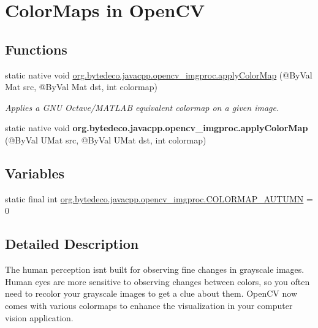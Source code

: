 \hypertarget{group__imgproc__colormap}{}\section{Color\+Maps in Open\+CV}
\label{group__imgproc__colormap}
\subsection*{Functions}
\begin{DoxyCompactItemize}
\item 
static native void \hyperlink{group__imgproc__colormap_ga06d689b1055417421851333387c2b607}{org.\+bytedeco.\+javacpp.\+opencv\+\_\+imgproc.\+apply\+Color\+Map} (@By\+Val Mat src, @By\+Val Mat dst, int colormap)
\begin{DoxyCompactList}\small\item\em Applies a G\+NU Octave/\+M\+A\+T\+L\+AB equivalent colormap on a given image. \end{DoxyCompactList}\item 
\mbox{\label{group__imgproc__colormap_gae1ccc84ecf15399edb67f8a9bdd23c24}} 
static native void {\bfseries org.\+bytedeco.\+javacpp.\+opencv\+\_\+imgproc.\+apply\+Color\+Map} (@By\+Val U\+Mat src, @By\+Val U\+Mat dst, int colormap)
\end{DoxyCompactItemize}
\subsection*{Variables}
\begin{DoxyCompactItemize}
\item 
static final int \hyperlink{group__imgproc__colormap_ga2dc59cecee33f4918f54902eae297e0c}{org.\+bytedeco.\+javacpp.\+opencv\+\_\+imgproc.\+C\+O\+L\+O\+R\+M\+A\+P\+\_\+\+A\+U\+T\+U\+MN} = 0
\end{DoxyCompactItemize}


\subsection{Detailed Description}
The human perception isn\textquotesingle{}t built for observing fine changes in grayscale images. Human eyes are more sensitive to observing changes between colors, so you often need to recolor your grayscale images to get a clue about them. Open\+CV now comes with various colormaps to enhance the visualization in your computer vision application. 

